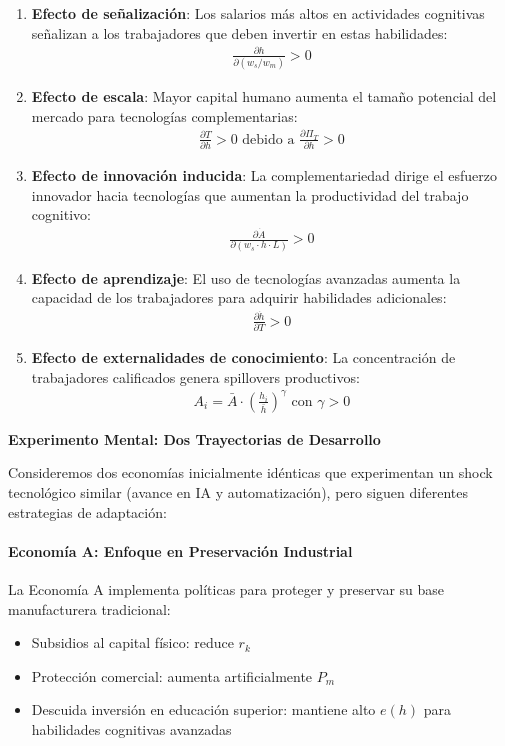 \documentclass{article}
\theoremstyle{remark}
\theoremstyle{definition}
\begin{document}
\begin{tcolorbox}
\begin{enumerate}
\item \textbf{Efecto de señalización}: Los salarios más altos en actividades cognitivas señalizan a los trabajadores que deben invertir en estas habilidades:
\begin{align}
\frac{\partial h}{\partial (w_s/w_m)} > 0
\end{align}

\item \textbf{Efecto de escala}: Mayor capital humano aumenta el tamaño potencial del mercado para tecnologías complementarias:
\begin{align}
\frac{\partial T}{\partial h} > 0 \text{ debido a } \frac{\partial \Pi_T}{\partial h} > 0
\end{align}

\item \textbf{Efecto de innovación inducida}: La complementariedad dirige el esfuerzo innovador hacia tecnologías que aumentan la productividad del trabajo cognitivo:
\begin{align}
\frac{\partial \dot{A}}{\partial (w_s \cdot h \cdot L)} > 0
\end{align}

\item \textbf{Efecto de aprendizaje}: El uso de tecnologías avanzadas aumenta la capacidad de los trabajadores para adquirir habilidades adicionales:
\begin{align}
\frac{\partial \dot{h}}{\partial T} > 0
\end{align}

\item \textbf{Efecto de externalidades de conocimiento}: La concentración de trabajadores calificados genera spillovers productivos:
\begin{align}
A_i = \bar{A} \cdot \left( \frac{h_i}{\bar{h}} \right)^\gamma \text{ con } \gamma > 0
\end{align}

\end{enumerate}

\textbf{Experimento Mental: Dos Trayectorias de Desarrollo}

Consideremos dos economías inicialmente idénticas que experimentan un shock tecnológico similar (avance en IA y automatización), pero siguen diferentes estrategias de adaptación:

\paragraph{Economía A: Enfoque en Preservación Industrial}
La Economía A implementa políticas para proteger y preservar su base manufacturera tradicional:
\begin{itemize}
\item Subsidios al capital físico: reduce $r_k$
\item Protección comercial: aumenta artificialmente $P_m$
\item Descuida inversión en educación superior: mantiene alto $e(h)$ para habilidades cognitivas avanzadas
\end{itemize}


\end{tcolorbox}
\end{document}
